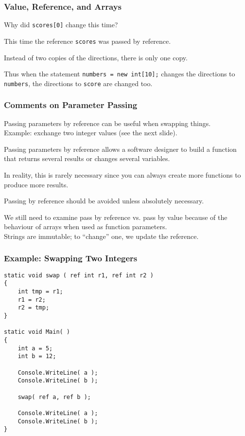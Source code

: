 \begin{frame}
\frametitle{Value, Reference, and Arrays}
Why did \texttt{scores[0]} change this time?

This time the reference \texttt{scores} was passed by reference.

Instead of two copies of the directions, there is only one copy.

Thus when the statement \texttt{numbers = new int[10];} changes the directions to \texttt{numbers}, the directions to \texttt{score} are changed too.

\end{frame}

\begin{frame}
\frametitle{Comments on Parameter Passing}
Passing parameters by reference can be useful when swapping things.\\
\quad Example: exchange two integer values (see the next slide).

Passing parameters by reference allows a software designer to build a function that returns several results or changes several variables.

In reality, this is rarely necessary since you can always create more functions to produce more results.

Passing by reference should be avoided unless absolutely necessary.

We still need to examine pass by reference vs. pass by value because of the behaviour of arrays when used as function parameters.\\
\quad Strings are immutable; to ``change'' one, we update the reference.
\end{frame}

\begin{frame}[fragile]
\frametitle{Example: Swapping Two Integers}
{\scriptsize
\begin{verbatim}
static void swap ( ref int r1, ref int r2 )
{
    int tmp = r1;
    r1 = r2;
    r2 = tmp;
}

static void Main( )
{
    int a = 5;
    int b = 12;
    
    Console.WriteLine( a );
    Console.WriteLine( b );
    
    swap( ref a, ref b );
    
    Console.WriteLine( a );
    Console.WriteLine( b );
}       
\end{verbatim}
}
\end{frame}



